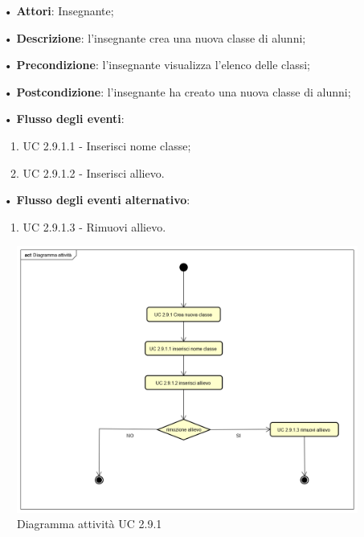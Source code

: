 \begin{itemize}
	\item[•] \textbf{Attori}: Insegnante;
	\item[•] \textbf{Descrizione}: l'insegnante crea una nuova classe di alunni;
	\item[•] \textbf{Precondizione}: l'insegnante visualizza l'elenco delle classi;
	\item[•] \textbf{Postcondizione}: l'insegnante ha creato una nuova classe di alunni;
	\item[•] \textbf{Flusso degli eventi}:
	\begin{enumerate}
		\item UC 2.9.1.1 - Inserisci nome classe;
		\item UC 2.9.1.2 - Inserisci allievo.
	\end{enumerate}
	\item[•] \textbf{Flusso degli eventi alternativo}:
	\begin{enumerate}
		\item UC 2.9.1.3 - Rimuovi allievo.
	\end{enumerate}
\end{itemize}

\begin{figure}[H]
	\centering
	\includegraphics[width=17cm]{img/Diagramma_attivita_crea_classe.png} 
	\caption{Diagramma attività UC 2.9.1}
\end{figure}


